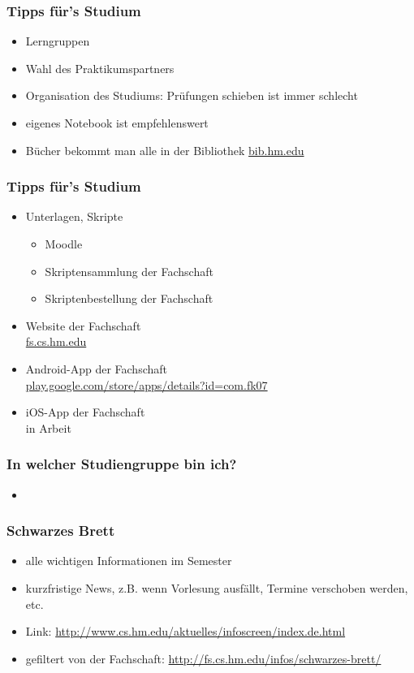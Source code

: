 \documentclass{beamer}
\begin{document}
     \begin{frame}[t]
     	\frametitle{Tipps für's Studium}
     	\begin{itemize}
     		\item Lerngruppen
     		\pause
     		\item Wahl des Praktikumspartners
     		\pause
     		\item Organisation des Studiums: Prüfungen schieben ist immer schlecht
     		\pause
     		\item eigenes Notebook ist empfehlenswert
     		\pause
     		\item Bücher bekommt man alle in der Bibliothek \url{bib.hm.edu}
     	\end{itemize}
     \end{frame}
     
     \begin{frame}[t]
     	\frametitle{Tipps für's Studium}
     	\begin{itemize}
     		\item Unterlagen, Skripte 
     		\begin{itemize}
     			\item Moodle
     			\item Skriptensammlung der Fachschaft
     			\item Skriptenbestellung der Fachschaft
     		\end{itemize}
     		\pause
     		\item Website der Fachschaft\\ \url{fs.cs.hm.edu}
     		\pause
     		\item Android-App der Fachschaft\\ \url{play.google.com/store/apps/details?id=com.fk07}
     		\pause
     		\item iOS-App der Fachschaft\\
     		in Arbeit	
     	\end{itemize}
     \end{frame}
     
     \begin{frame}[t]
     	\frametitle{In welcher Studiengruppe bin ich?}
     	\begin{itemize}
     		\item
     	\end{itemize}
     \end{frame}
     
     \begin{frame}
     	\frametitle{Schwarzes Brett}
     	\begin{itemize}
     		\item alle wichtigen Informationen im Semester
     		\item kurzfristige News, z.B. wenn Vorlesung ausfällt, Termine verschoben werden, etc.
     		\item Link: \footnotesize{\url{http://www.cs.hm.edu/aktuelles/infoscreen/index.de.html}}
     		\item \normalsize{gefiltert von der Fachschaft:} \footnotesize{\url{http://fs.cs.hm.edu/infos/schwarzes-brett/}}
     	\end{itemize}
     \end{frame}
     
\end{document}
